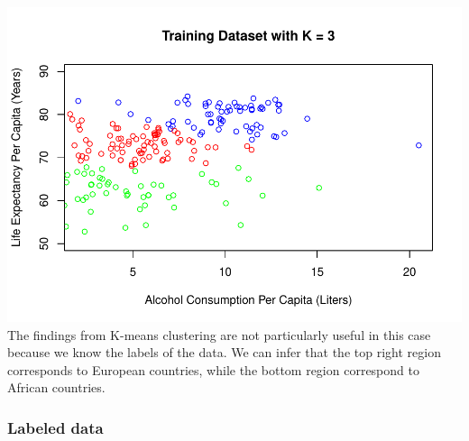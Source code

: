 \documentclass[
]{article}
\begin{document}
\includegraphics{final_report_files/figure-latex/unnamed-chunk-12-1.pdf}
The findings from K-means clustering are not particularly useful in this
case because we know the labels of the data. We can infer that the top
right region corresponds to European countries, while the bottom region
correspond to African countries.

\hypertarget{labeled-data}{%
\subsubsection{Labeled data}\label{labeled-data}}
\end{document}
